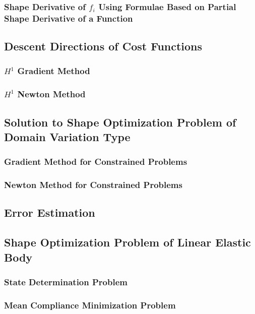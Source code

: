 \documentclass[oneside]{book}
\numberwithin{equation}{section}
\begin{document}
\subsubsection{Shape Derivative of $f_i$ Using Formulae Based on Partial Shape Derivative of a Function}

\subsection{Descent Directions of Cost Functions}

\subsubsection{$H^1$ Gradient Method}

\subsubsection{$H^1$ Newton Method}

\subsection{Solution to Shape Optimization Problem of Domain Variation Type}

\subsubsection{Gradient Method for Constrained Problems}

\subsubsection{Newton Method for Constrained Problems}

\subsection{Error Estimation}

\subsection{Shape Optimization Problem of Linear Elastic Body}

\subsubsection{State Determination Problem}

\subsubsection{Mean Compliance Minimization Problem}
\end{document}
